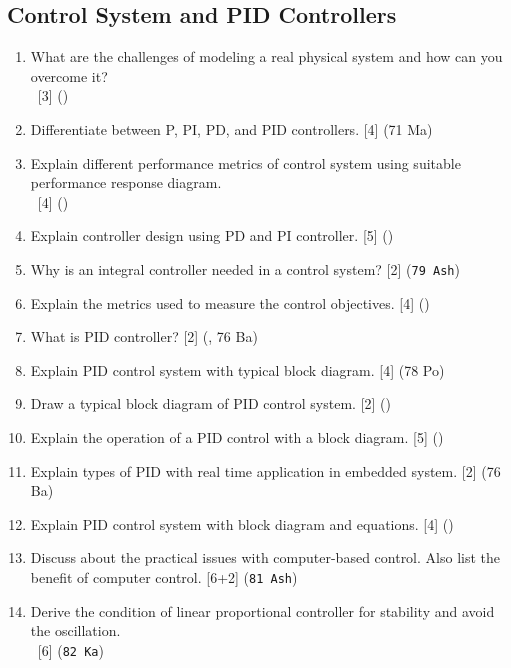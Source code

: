 \documentclass[12pt]{article}
\newcommand{\enter}{\\\textcolor{white}{1}}
\begin{document}
  \subsection{Control System and PID Controllers}
    \begin{enumerate}
      \item What are the challenges of modeling a real physical system and how can you overcome it? 
        \enter\hfill [3] ()

      \item Differentiate between P, PI, PD, and PID controllers. \hfill [4] (71 Ma)

      \item Explain different performance metrics of control system using suitable performance response diagram.
        \enter\hfill [4] ()

      \item Explain controller design using PD and PI controller. \hfill [5] ()

      \item Why is an integral controller needed in a control system? \hfill [2] (\texttt{79 Ash})

      \item Explain the metrics used to measure the control objectives. \hfill [4] ()

      \item What is PID controller? \hfill [2] (, 76 Ba)

      \item Explain PID control system with typical block diagram. \hfill [4] (78 Po)

      \item Draw a typical block diagram of PID control system. \hfill [2] ()

      \item Explain the operation of a PID control with a block diagram. \hfill [5] ()

      \item Explain types of PID with real time application in embedded system. \hfill [2] (76 Ba)

      \item Explain PID control system with block diagram and equations. \hfill [4] ()

      \item Discuss about the practical issues with computer-based control. Also list the benefit of computer control. \hfill [6+2] (\texttt{81 Ash})

      \item Derive the condition of linear proportional controller for stability and avoid the oscillation.
        \enter\hfill [6] (\texttt{82 Ka})
    \end{enumerate}
\end{document}
